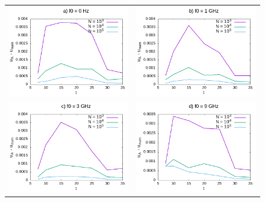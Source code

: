 \documentclass[11pt,a4paper]{report}
\begin{document}
\begin{figure}
\begin{tabular}{cc}
  \includegraphics[width=75mm]{zad4/zad4_0} &   \includegraphics[width=75mm]{zad4/zad4_1} \\
  \includegraphics[width=75mm]{zad4/zad4_3} &   \includegraphics[width=75mm]{zad4/zad4_9} \\

\end{tabular}
\end{figure}
\end{document}
